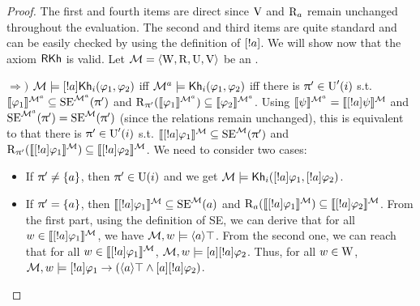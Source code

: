 \begin{proof}
The first and fourth items are direct since $\V$ and $\R_a$ remain unchanged throughout the evaluation. The second and third items are quite standard and can be easily checked by using the definition of $\srefbox{a}$.
We will show now that the axiom $\axm{RKh}$ is valid. 
Let $\modults = \tup{\W, \R, \Unc, \V}$ be an \ults.

$\Rightarrow)$ $\modults \models \srefbox{a} \khi(\varphi_1,\varphi_2)$ iff $\modults^a \models \khi(\varphi_1,\varphi_2)$ iff there is $\plans' \in \Unc'(i)$ s.t. $\truthset{\modults^a}{\varphi_1} \subseteq \stexec^{\modults^a}(\plans')$ and $\R_{\plans'}(\truthset{\modults^a}{\varphi_1}) \subseteq \truthset{\modults^a}{\varphi_2}$.
Using $\truthset{\modults^a}{\psi} = \truthset{\modults}{\srefbox{a} \psi}$ and $\stexec^{\modults^a}(\plans') = \stexec^\modults(\plans')$ (since the relations remain unchanged), this is equivalent to that there is $\plans' \in \Unc'(i)$ s.t. $\truthset{\modults}{\srefbox{a} \varphi_1} \subseteq \stexec^\modults(\plans')$ and $\R_{\plans'}(\truthset{\modults}{\srefbox{a} \varphi_1}) \subseteq \truthset{\modults}{\srefbox{a} \varphi_2}$. We need to consider two cases:
\begin{itemize}
\item If $\plans' \neq \set{a}$, then $\plans' \in \Unc(i)$ and we get $\modults \models \khi(\srefbox{a}\varphi_1,\srefbox{a}\varphi_2)$.
\item If $\plans' = \set{a}$, then $\truthset{\modults}{\srefbox{a}\varphi_1} \subseteq \stexec^\modults(a)$ and $\R_a(\truthset{\modults}{\srefbox{a}\varphi_1}) \subseteq \truthset{\modults}{\srefbox{a}\varphi_2}$.
From the first part, using the definition of SE, we can derive that for all $w \in \truthset{\modults}{\srefbox{a}\varphi_1}$, we have $\modults,w \models \mldiam{a}\top$.
From the second one, we can reach that for all $w \in \truthset{\modults}{\srefbox{a}\varphi_1}$, $\modults,w \models \mlbox{a} \srefbox{a}\varphi_2$.
Thus, for all $w \in \W$, $\modults,w \models \srefbox{a} \varphi_1 \ra (\mldiam{a}\top \wedge \mlbox{a} \srefbox{a}\varphi_2)$.
\end{itemize}


\end{proof}

